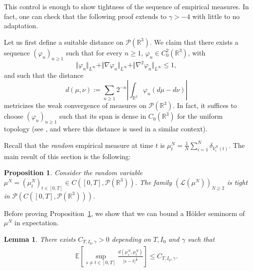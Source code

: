 \documentclass[11pt,a4paper]{article}
\theoremstyle{definition}
\theoremstyle{plain}
\newtheorem{lemma}[defi]{Lemma}
\newtheorem{prop}[defi]{Proposition}
\begin{document}
This control is enough to show tightness of the sequence of empirical measures. In fact, one can check that the following proof extends to $\gamma>-4$ with little to no adaptation.

Let us first define a suitable distance on $\mathcal{P}(\mathbb{R}^3)$.
We claim that there exists a sequence $(\varphi_n)_{n\geq 1}$ such that for every $n\geq 1$, $\varphi_n \in C^2_0(\mathbb{R}^3)$, with
\begin{equation}
\label{eq:phi_nbounds}
    \Vert \varphi_n \Vert_{L^\infty} + \Vert \nabla \varphi_n \Vert_{L^\infty}+ \Vert \nabla^2 \varphi_n \Vert_{L^\infty}\leq 1,
\end{equation}
and such that the distance
$$d(\mu,\nu):= \sum_{n\geq 1} 2^{-n} \left\vert \int_{\mathbb{R}^3} \varphi_n (d\mu-d\nu) \right\vert$$
metricizes the weak convergence of measures on $\mathcal{P}(\mathbb{R}^3)$. In fact, it suffices to choose $(\varphi_n)_{n\geq 1}$ such that its span is dense in $C_0(\mathbb{R}^3)$ for the uniform topology (see \cite[Chapter 6]{Villani2009}, and \cite{Tardy2023} where this distance is used in a similar context).

Recall that the \textit{random} empirical measure at time $t$ is $\mu^N_t=\frac{1}{N}\sum_{i=1}^N \delta_{V^N_i(t)}$. The main result of this section is the following:
\begin{prop}
\label{prop:tightness2}
Consider the random variable $\mu^N=(\mu^N_t)_{t\in[0,T]} \in C\left([0,T],\mathcal{P}(\mathbb{R}^3)\right)$. The family $\left(\mathcal{L}\left( \mu^N\right) \right)_{N\geq 2 }$ is tight in $\mathcal{P} \left(C\left([0,T],\mathcal{P}(\mathbb{R}^3)\right)\right)$.
\end{prop}

Before proving Proposition~\ref{prop:tightness2}, we show that we can bound a Hölder seminorm of $\mu^N$ in expectation.
\begin{lemma}
    \label{lem:holdercont}
    There exists $C_{T,I_0,\gamma}>0$ depending on $T,I_0$ and $\gamma$ such that 
    \begin{align*}
   \mathbb{E}\left[  \sup_{s\neq t\in[0,T]} \frac{d(\mu^N_s,\mu^N_t)}{\vert s-t \vert^\frac{1}{8}} \right]\leq C_{T,I_0,\gamma}.
\end{align*}
\end{lemma}
\end{document}
